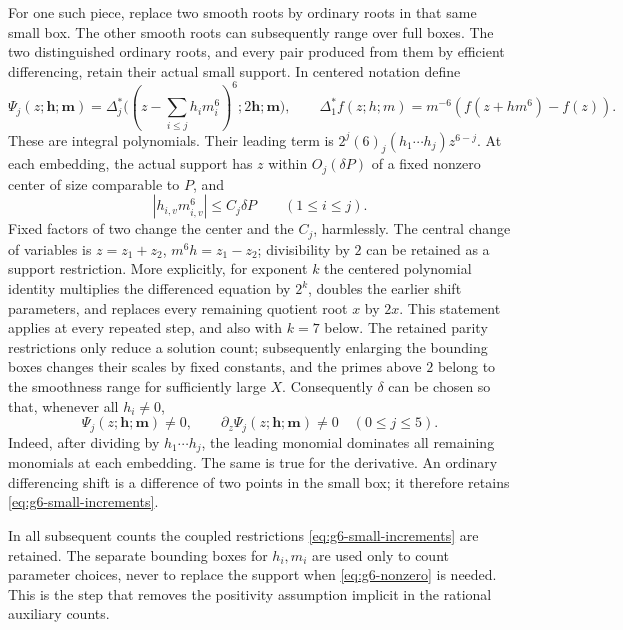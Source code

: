 \documentclass[11pt,reqno]{amsart}
\numberwithin{equation}{section}
\theoremstyle{definition}
\begin{document}
For one such piece, replace two smooth roots by ordinary roots in that same
small box.  The other smooth roots can subsequently range over full boxes.
The two distinguished ordinary roots, and every pair produced from them by
efficient differencing, retain their actual small support.
In centered notation define
\[
 \Psi_j(z;\mathbf h;\mathbf m)=
 \Delta^*_j\bigl((z-\textstyle\sum_{i\le j}h_i m_i^6)^6;
                 2\mathbf h;\mathbf m\bigr),
 \qquad
 \Delta^*_1 f(z;h;m)=m^{-6}(f(z+hm^6)-f(z)).
\]
These are integral polynomials.  Their leading term is
$2^j(6)_j(h_1\cdots h_j)z^{6-j}$.
At each embedding, the actual support has $z$ within $O_j(\delta P)$ of a
fixed nonzero center of size comparable to $P$, and
\begin{equation}\label{eq:g6-small-increments}
 |h_{i,v}m_{i,v}^6|\le C_j\delta P\qquad(1\le i\le j).
\end{equation}
Fixed factors of two change the center and the $C_j$, harmlessly.
The central change of variables is $z=z_1+z_2$,
$m^6h=z_1-z_2$; divisibility by $2$ can be retained as a support restriction.
More explicitly, for exponent $k$ the centered polynomial identity multiplies
the differenced equation by $2^k$, doubles the earlier shift parameters, and
replaces every remaining quotient root $x$ by $2x$.
This statement applies at every repeated step, and also with $k=7$ below.
The retained parity restrictions only reduce a solution count; subsequently
enlarging the bounding boxes changes their scales by fixed constants, and the
primes above $2$ belong to the smoothness range for sufficiently large $X$.
Consequently $\delta$ can be chosen so that, whenever all $h_i\ne0$,
\begin{equation}\label{eq:g6-nonzero}
 \Psi_j(z;\mathbf h;\mathbf m)\ne0,
 \qquad \partial_z\Psi_j(z;\mathbf h;\mathbf m)\ne0
 \quad(0\le j\le5).
\end{equation}
Indeed, after dividing by $h_1\cdots h_j$, the leading monomial dominates
all remaining monomials at each embedding.  The same is true for the derivative.
An ordinary differencing shift is a difference of two points in the small box;
it therefore retains \eqref{eq:g6-small-increments}.

In all subsequent counts the coupled restrictions
\eqref{eq:g6-small-increments} are retained.  The separate bounding boxes for
$h_i,m_i$ are used only to count parameter choices, never to replace the support
when \eqref{eq:g6-nonzero} is needed.  This is the step that removes the
positivity assumption implicit in the rational auxiliary counts.
\end{document}
